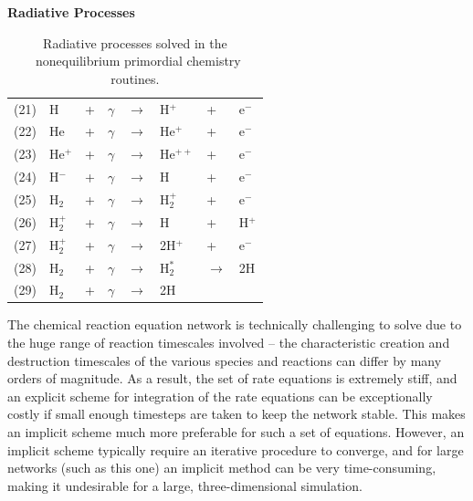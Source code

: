\begin{table}
\begin{center}
{\bfseries Radiative Processes}\\[1ex]
\begin{tabular}{llllllll}
(21) & H & + & $\gamma$ & $\rightarrow$ & H$^+$ & + & e$^-$ \\
(22) & He & + & $\gamma$ & $\rightarrow$ & He$^+$ & + & e$^-$ \\
(23) & He$^+$ & + & $\gamma$ & $\rightarrow$ & He$^{++}$ & + & e$^-$ \\
(24) & H$^-$ & + & $\gamma$ & $\rightarrow$ & H & + & e$^-$ \\
(25) & H$_2$ & + & $\gamma$ & $\rightarrow$ & H$_2^+$ & + & e$^-$ \\
(26) & H$_2^+$ & + & $\gamma$ & $\rightarrow$ & H & + & H$^+$ \\
(27) & H$_2^+$ & + & $\gamma$ & $\rightarrow$ & 2H$^+$ & + & e$^-$ \\
(28) & H$_2$ & + & $\gamma$ & $\rightarrow$ & H$_2^*$ & $\rightarrow$ & 2H \\
(29) & H$_2$ & + & $\gamma$ & $\rightarrow$ & 2H &  & 
\end{tabular}
\caption[]{Radiative processes solved in the \enzo\ nonequilibrium
primordial chemistry routines.}
\label{table.radiative}
\end{center}
\end{table}


The chemical reaction equation network is technically challenging to solve due to 
the huge range of reaction timescales involved -- the characteristic creation
and destruction timescales of the various species and reactions can differ by 
many orders of magnitude.  As a result, the set of rate equations is extremely 
stiff, and an explicit scheme for integration of the rate equations can be 
exceptionally costly if small enough timesteps are taken to keep the network
stable.  This makes an implicit scheme much more preferable for such a set of 
equations.  However, an implicit scheme typically require an iterative 
procedure to converge, and for large networks (such as this one) an implicit
method can be very time-consuming, making it undesirable for a large, three-dimensional
simulation.

